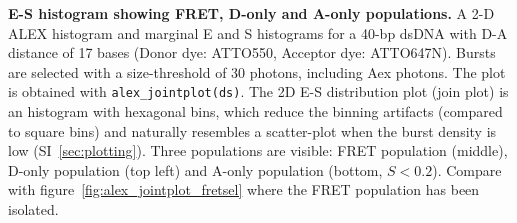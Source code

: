 \label{fig:alex_jointplot} \textbf{E-S histogram showing FRET, D-only and A-only populations.}
A 2-D ALEX histogram and marginal E and S histograms for a 40-bp dsDNA 
with D-A distance of 17 bases (Donor dye: ATTO550, Acceptor dye: ATTO647N). 
Bursts are selected with a size-threshold of 30 photons, including Aex photons. 
The plot is obtained with \texttt{alex\_jointplot(ds)}. The 2D E-S distribution plot (join plot)
is an histogram with hexagonal bins, which reduce the binning artifacts (compared to square bins)
and naturally resembles a scatter-plot when the burst density is low
(SI~\ref{sec:plotting}).
Three populations are visible: FRET population (middle), D-only population (top left) and 
A-only population (bottom, $S < 0.2$). Compare with figure~\ref{fig:alex_jointplot_fretsel} 
where the FRET population has been isolated.

